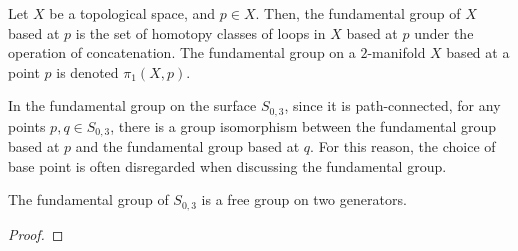 \documentclass{amsart}
\begin{document}
	\begin{comment}
			\begin{tcolorbox}
			\begin{itemize}
				\item Specialize to $S_{0,3}$
				\item Since $S_{0,3}$ is path-connected, for any $p,q\in S_{0,3}$, there is an isomorphism of groups between the fundamental groups based at $p$ and $q$. Quick reminder: how. Therefore, we can just talk about the fundamental group of $S_{0,3}$ without specifying the base point.
				\item Lemma: The fundamental group of $S_{0,3}$ is the free group on two generators.
				\item Proof: Seifert-Van Kampen.
			\end{itemize}
		\end{tcolorbox}
	\end{comment}


	\begin{definition}
		Let $X$ be a topological space, and $p \in X$. Then, the fundamental group of $X$ based at $p$ is the set of homotopy classes of loops in $X$ based at $p$ under the operation of concatenation. The fundamental group on a $2$-manifold $X$ based at a point $p$ is denoted $\pi_1(X,p)$.
	\end{definition}
	
	In the fundamental group on the surface $S_{0,3}$, since it is path-connected, for any points $p, q \in S_{0,3}$, there is a group isomorphism between the fundamental group based at $p$ and the fundamental group based at $q$. For this reason, the choice of base point is often disregarded when discussing the fundamental group.
	
	\begin{lemma}
		The fundamental group of $S_{0,3}$ is a free group on two generators.
	\end{lemma}
	
	\begin{proof}
	\end{proof}
	
	\begin{comment}
		In a path connected topological space, a \emph{loop} is a continuous path inside the topological space where the starting point and the ending point are the same. There are potentially infinitely many loops that start and end at a point $p$ in the topological space, but we can partition the set of loops based at $p$ by grouping together the loops that are homotopy equivalent. We can operate on these equivalence classes of loops by concatenation. Essentially, you can \inquotes{glue} the end of the first loop to the start of the second loop. This set of equivalence classes paired with the concatenation operation forms a group with the identity being the \inquotes{constant} loop (i.e. the loop that never leaves the starting point).
	\end{comment}
	 
\end{document}
